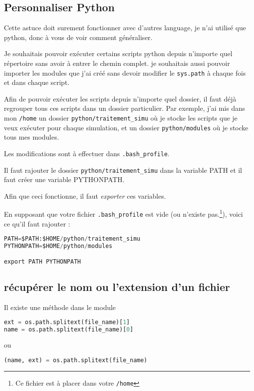 \documentclass[a4paper,twoside]{article}
\begin{document}
\subsection{Personnaliser Python}
Cette astuce doit surement fonctionner avec d'autres language, je  n'ai utilisé que python, donc à vous de voir comment généraliser.

Je souhaitais pouvoir exécuter certains scripts python depuis  n'importe quel répertoire sans avoir à entrer le chemin complet. je  souhaitais aussi pouvoir importer les modules que j'ai créé sans  devoir modifier le \texttt{sys.path} à chaque fois et dans chaque  script.

Afin de pouvoir exécuter les scripts depuis n'importe quel dossier,  il faut déjà regrouper tous ces scripts dans un dossier particulier.  Par exemple, j'ai mis dans mon \texttt{/home} un dossier \texttt {python/traitement\_simu} où je stocke les scripts que je veux  exécuter pour chaque simulation, et un dossier \texttt{python/modules} où je stocke tous mes modules.

Les modifications sont à effectuer dans \texttt{.bash\_profile}.

Il faut rajouter le dossier \texttt{python/traitement\_simu} dans la  variable PATH et il faut créer une variable PYTHONPATH.

\begin{attention}
Afin que ceci fonctionne, il faut \emph{exporter} ces variables.
\end{attention}

En supposant que votre fichier \texttt{.bash\_profile} est vide (ou  n'existe pas.\footnote{Ce fichier est à placer dans votre \texttt{/home}}), voici ce qu'il faut rajouter :
\begin{lstlisting}[language=python]
PATH=$PATH:$HOME/python/traitement_simu
PYTHONPATH=$HOME/python/modules

export PATH PYTHONPATH
\end{lstlisting}

\subsection{récupérer le nom ou l'extension d'un fichier}
Il existe une méthode dans le module 
\begin{lstlisting}[language=python]
ext = os.path.splitext(file_name)[1]
name = os.path.splitext(file_name)[0]
\end{lstlisting}
ou 
\begin{lstlisting}[language=python]
(name, ext) = os.path.splitext(file_name)
\end{lstlisting}
\end{document}
